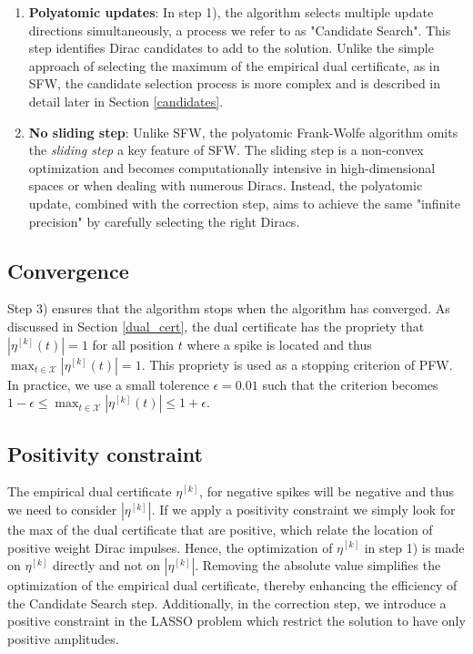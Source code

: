 \documentclass[a4paper,12pt,oneside]{report}
\theoremstyle{named}
\begin{document}
\begin{enumerate}
    \item \textbf{Polyatomic updates}: In step 1), the algorithm selects multiple update directions simultaneously, a process we refer to as "Candidate Search". This step identifies Dirac candidates to add to the solution. Unlike the simple approach of selecting the maximum of the empirical dual certificate, as in SFW, the candidate selection process is more complex and is described in detail later in Section \ref{candidates}.
    \item \textbf{No sliding step}: Unlike SFW, the polyatomic Frank-Wolfe algorithm omits the \textit{sliding step} a key feature of SFW. The sliding step is a non-convex optimization and becomes computationally intensive in high-dimensional spaces or when dealing with numerous Diracs. Instead, the polyatomic update, combined with the correction step, aims to achieve the same "infinite precision" by carefully selecting the right Diracs.
\end{enumerate}

\subsection{Convergence}
Step 3) ensures that the algorithm stops when the algorithm has converged. As discussed in Section \ref{dual_cert}, the dual certificate has the propriety that $|\eta^{[k]}(t)| = 1$ for all position $t$ where a spike is located and thus $ \max_{t \in \mathcal{X}} |\eta^{[k]}(t)| = 1$. This propriety is used as a stopping criterion of PFW. In practice, we use a small tolerence $\epsilon = 0.01$ such that the criterion becomes $1 - \epsilon \leq \max_{t \in \mathcal{X}} |\eta^{[k]}(t)| \leq 1 + \epsilon$.

\subsection{Positivity constraint}
 The empirical dual certificate $\eta^{[k]}$, for negative spikes will be negative and thus we need to consider $|\eta^{[k]}|$. If we apply a positivity constraint we simply look for the max of the dual certificate that are positive, which relate the location of positive weight Dirac impulses. Hence, the optimization of $\eta^{[k]}$ in step 1) is made on $\eta^{[k]}$ directly and not on $|\eta^{[k]}|$. Removing the absolute value simplifies the optimization of the empirical dual certificate, thereby enhancing the efficiency of the Candidate Search step. Additionally, in the correction step, we introduce a positive constraint in the LASSO problem which restrict the solution to have only positive amplitudes.
\end{document}
